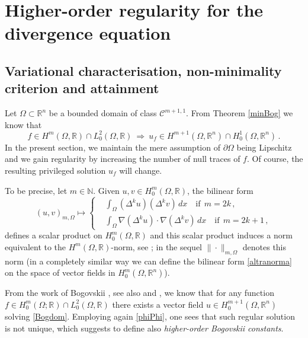 \documentclass[11pt]{article}
\theoremstyle{plain}
\theoremstyle{definition}
\numberwithin{equation}{section}
\newcommand{\R}{\mathbb{R}}
\newcommand{\N}{\mathbb{N}}
\begin{document}
\section{Higher-order regularity for the divergence equation}\label{polyBogo}

\subsection{Variational characterisation, non-minimality criterion and attainment}
Let $\Omega\subset\R^n$ be a bounded domain of class ${\mathcal C}^{m+1,1}$. From Theorem \ref{minBog} we know that
$$f\in H^m(\Omega, \mathbb{R})\cap L^2_0(\Omega, \mathbb{R})\ \Longrightarrow\ u_f\in H^{m+1}(\Omega, \mathbb{R}^{n})\cap H^1_0(\Omega, \mathbb{R}^{n})\, .$$
In the present section, we maintain the mere assumption of $\partial\Omega$ being Lipschitz and we gain regularity by increasing the number
of null traces of $f$. Of course, the resulting privileged solution $u_f$ will change.\par
To be precise, let $m\in\N$.  Given $u,v \in H_0^m(\Omega, \mathbb{R})$, the bilinear form
\begin{equation} \label{altranorma}
	(u,v)_{m,\Omega}\mapsto
	\left\{
	\begin{aligned}
		& \int_\Omega (\Delta^k u) (\Delta^k v) \, dx \quad \mbox{if} \ \ m=2k \, ,\\[6pt]
		& \int_\Omega\nabla(\Delta^k u)\cdot\nabla(\Delta^kv)\, dx\quad \mbox{if} \ \ m=2k+1 \, ,
	\end{aligned}
	\right.
\end{equation}
defines a scalar product on $H_0^m(\Omega, \mathbb{R})$ and this scalar product induces a norm equivalent to the $H^m(\Omega, \mathbb{R})$-norm, see  \cite[Theorem 2.2]{GGSbook};
in the sequel  $\|\cdot\|_{m,\Omega}$ denotes  this norm (in a completely similar way we can define the bilinear form \eqref{altranorma} on the space of vector fields in $H_0^m(\Omega, \mathbb{R}^{n})$).\par
From the work of Bogovskii \cite{bogovskii1979solution}, see also \cite[Theorem III.3.3]{galdi2011introduction} and \cite{geissert2006equation}, we
know that for any function $f\in H^m_0(\Omega; \mathbb{R}) \cap L^2_0(\Omega, \mathbb{R})$ there exists a vector field $u\in H^{m+1}_0(\Omega, \mathbb{R}^{n})$ solving \eqref{Bogdom}. Employing again \eqref{phiPhi},
one sees that such regular solution is not unique, which suggests to define also {\em higher-order Bogovskii constants}.
\end{document}
